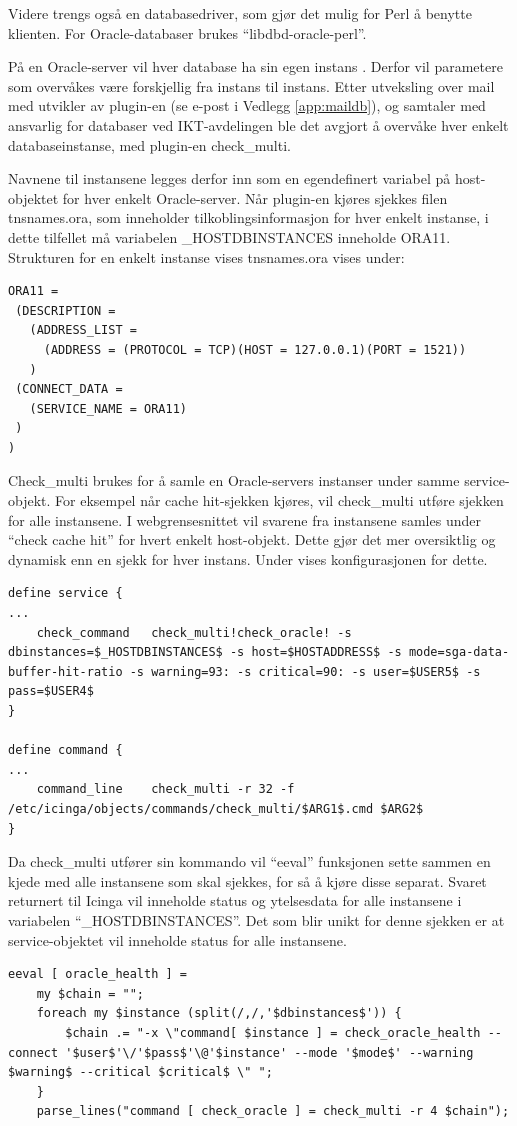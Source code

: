 Videre trengs også en databasedriver, som gjør det mulig for Perl å benytte klienten. For Oracle-databaser brukes ``libdbd-oracle-perl''.

På en Oracle-server vil hver database ha sin egen instans \cite{oraclefaq}. Derfor vil parametere som overvåkes være forskjellig fra instans til instans. Etter utveksling over mail med utvikler av plugin-en (se e-post i Vedlegg \ref{app:maildb}), og samtaler med ansvarlig for databaser ved IKT-avdelingen ble det avgjort å overvåke hver enkelt databaseinstanse, med plugin-en check\_multi.

Navnene til instansene legges derfor inn som en egendefinert variabel på host-objektet for hver enkelt Oracle-server. Når plugin-en kjøres sjekkes filen tnsnames.ora, som inneholder tilkoblingsinformasjon for hver enkelt instanse, i dette tilfellet må variabelen \_HOSTDBINSTANCES inneholde ORA11. Strukturen for en enkelt instanse vises tnsnames.ora vises under:
\begin{lstlisting}[style=example]
ORA11 =
 (DESCRIPTION = 
   (ADDRESS_LIST =
     (ADDRESS = (PROTOCOL = TCP)(HOST = 127.0.0.1)(PORT = 1521))
   )
 (CONNECT_DATA =
   (SERVICE_NAME = ORA11)
 )
)
\end{lstlisting}

Check\_multi brukes for å samle en Oracle-servers instanser under samme service-objekt. For eksempel når cache hit-sjekken kjøres, vil check\_multi utføre sjekken for alle instansene. I webgrensesnittet vil svarene fra instansene samles under ``check cache hit'' for hvert enkelt host-objekt. Dette gjør det mer oversiktlig og dynamisk enn en sjekk for hver instans. Under vises konfigurasjonen for dette.
\begin{lstlisting}[style=example]
define service {
...
    check_command	check_multi!check_oracle! -s dbinstances=$_HOSTDBINSTANCES$ -s host=$HOSTADDRESS$ -s mode=sga-data-buffer-hit-ratio -s warning=93: -s critical=90: -s user=$USER5$ -s pass=$USER4$
}

define command {
...
	command_line	check_multi -r 32 -f /etc/icinga/objects/commands/check_multi/$ARG1$.cmd $ARG2$
}
\end{lstlisting}
Da check\_multi utfører sin kommando vil ``eeval'' funksjonen sette sammen en kjede med alle instansene som skal sjekkes, for så å kjøre disse separat. Svaret returnert til Icinga vil inneholde status og ytelsesdata for alle instansene i variabelen ``\_HOSTDBINSTANCES''. Det som blir unikt for denne sjekken er at service-objektet vil inneholde status for alle instansene.
\begin{lstlisting}[style=example]
eeval [ oracle_health ] =
    my $chain = "";
    foreach my $instance (split(/,/,'$dbinstances$')) {
        $chain .= "-x \"command[ $instance ] = check_oracle_health --connect '$user$'\/'$pass$'\@'$instance' --mode '$mode$' --warning $warning$ --critical $critical$ \" ";
    }
    parse_lines("command [ check_oracle ] = check_multi -r 4 $chain");
\end{lstlisting}

